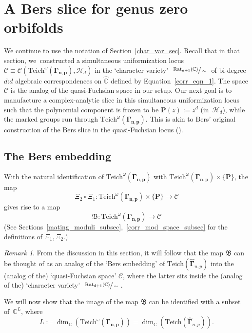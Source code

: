 \documentclass[JEP,XML,SOM,Unicode,NoFloatCountersInSection,published]{cedram}
\let\faktor\sfrac
\theoremstyle{definition}
\theoremstyle{remark}
\newtheorem{remark}[lemma]{Remark}
\newcommand{\C}{\mathbb{C}}
\newcommand{\cC}{\mathcal{C}}
\begin{document}
\section{A Bers slice for genus zero orbifolds}\label{punc_sphere_bers_sec}
We continue to use the notation of Section~\ref{char_var_sec}. Recall that in that section, we~constructed a simultaneous uniformization locus $\cC\equiv\cC\left(\mathrm{Teich}^\omega(\pmb{\Gamma_{n,p}}),\mathcal{H}_{d}\right)$ in the `character variety' $\ \faktor{\mathrm{Rat}_{d+1}(\C)}{\sim}\ $ of bi-degree $d$:$d$ algebraic correspondences on $\widehat{\C}$ defined by Equation~\eqref{corr_eqn_1}. The space $\cC$ is the analog of the quasi-Fuchsian space in our setup. Our next goal is to manufacture a complex-analytic slice in this simultaneous uniformization locus such that the polynomial component is frozen to be $\pmb{P}(z):=z^d$ (in~$\mathcal{H}_d$), while the marked groups run through $\mathrm{Teich}^\omega(\pmb{\Gamma_{n,p}})$. This is akin to Bers' original construction of the Bers slice in the quasi-Fuchsian locus (\cf \cite[\S 5.10]{Mar16}).

\subsection{The Bers embedding}\label{bers_embed_subsec}

With the natural identification of $\mathrm{Teich}^\omega(\pmb{\Gamma_{n,p}})$ with $\mathrm{Teich}^\omega(\pmb{\Gamma_{n,p}}) \times\{\pmb{P}\}$, the map
\[
\Xi_2\circ\Xi_1:\mathrm{Teich}^\omega(\pmb{\Gamma_{n,p}}) \times\{\pmb{P}\}\to \cC
\]
gives rise to a map
\[
\mathfrak{B}:\mathrm{Teich}^\omega(\pmb{\Gamma_{n,p}})\to \cC
\]
(See Sections~\ref{mating_moduli_subsec},~\ref{corr_mod_space_subsec} for the definitions of $\Xi_1,\Xi_2$.)

\begin{remark}
From the discussion in this section, it will follow that the map $\mathfrak{B}$ can be thought of as an analog of the `Bers embedding' of $\mathrm{Teich}(\widehat{\pmb{\Gamma}}_{n,p})$ into the (analog of the) `quasi-Fuchsian space' $\cC$, where the latter sits inside the
(analog of the) `character variety' $\ \faktor{\mathrm{Rat}_{d+1}(\C)}{\sim}\ $.
\end{remark}

We will now show that the image of the map $\mathfrak{B}$ can be identified with a subset of~$\C^L$, where
\[
L:=\dim_{\C}\left(\mathrm{Teich}^\omega(\pmb{\Gamma_{n,p}})\right)=\dim_{\C}(\mathrm{Teich}(\widehat{\pmb{\Gamma}}_{n,p})).
\]
\end{document}
